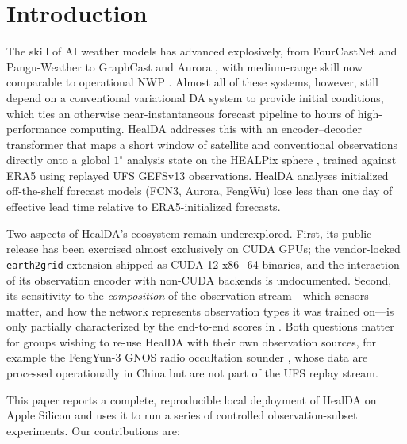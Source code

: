 \documentclass[twocolumn,11pt]{article}
\begin{document}
\section{Introduction}\label{sec:intro}

The skill of AI weather models has advanced explosively, from
FourCastNet \citep{pathak2022fourcastnet} and Pangu-Weather
\citep{bi2023pangu} to GraphCast \citep{lam2023graphcast} and Aurora
\citep{bodnar2024aurora}, with medium-range skill now comparable to
operational NWP \citep{bauer2015quiet}. Almost all of these systems,
however, still depend on a conventional variational DA system to
provide initial conditions, which ties an otherwise
near-instantaneous forecast pipeline to hours of high-performance
computing. HealDA \citep{gupta2026healda} addresses this with an
encoder--decoder transformer that maps a short window of satellite
and conventional observations directly onto a global $1^{\circ}$
analysis state on the HEALPix sphere \citep{gorski2005healpix},
trained against ERA5 \citep{hersbach2020era5} using replayed UFS
GEFSv13 observations. HealDA analyses initialized off-the-shelf
forecast models (FCN3, Aurora, FengWu) lose less than one day of
effective lead time relative to ERA5-initialized forecasts.

Two aspects of HealDA's ecosystem remain underexplored. First, its
public release has been exercised almost exclusively on CUDA GPUs; the
vendor-locked \texttt{earth2grid} extension shipped as CUDA-12
x86\_64 binaries, and the interaction of its observation encoder with
non-CUDA backends is undocumented. Second, its sensitivity to the
\emph{composition} of the observation stream---which sensors matter,
and how the network represents observation types it was trained
on---is only partially characterized by the end-to-end scores in
\citet{gupta2026healda}. Both questions matter for groups wishing to
re-use HealDA with their own observation sources, for example the
FengYun-3 GNOS radio occultation sounder
\citep{liao2016gnos}, whose data are processed operationally in China
but are not part of the UFS replay stream.

This paper reports a complete, reproducible local deployment of
HealDA on Apple Silicon and uses it to run a series of controlled
observation-subset experiments. Our contributions are:
\end{document}
